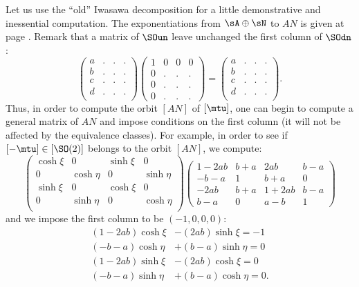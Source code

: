 Let us use the ``old''{} Iwasawa decomposition for a little demonstrative and inessential computation. The exponentiations from $\sA\oplus\sN$ to $AN$ is given at page \pageref{pg:exp_AN}. Remark that a matrix of $\SOun$ leave unchanged the first column of $\SOdn$: 
\[
\begin{pmatrix}
  a&.&.&.\\
  b&.&.&.\\
  c&.&.&.\\
  d&.&.&.\\
\end{pmatrix}
\begin{pmatrix}
 1&0&0&0\\
 0&.&.&.\\
 0&.&.&.\\
 0&.&.&.
\end{pmatrix}=
\begin{pmatrix}
  a&.&.&.\\
  b&.&.&.\\
  c&.&.&.\\
  d&.&.&.\\
\end{pmatrix}.
\]
Thus, in order to compute the orbit $[AN]$ of $[\mtu]$, one can begin to compute a general matrix of $AN$ and impose conditions on the first column (it will not be affected by the equivalence classes). For example, in order to see if $[-\mtu]\in [\SO(2)]$ belongs to the orbit $[AN]$, we compute:\label{PgExplAN}
\begin{equation}\label{eq:gene_R}			
   \begin{pmatrix}
  \cosh\xi &    0      & \sinh\xi &    0  \\
    0       & \cosh\eta &    0      & \sinh\eta \\
  \sinh\xi &    0      & \cosh\xi &    0     \\
    0       & \sinh\eta &    0      & \cosh\eta \\
     \end{pmatrix}
     \begin{pmatrix}
                 1-2ab & b+a & 2ab   & b-a \\
 		 -b-a  & 1   & b+a   &  0   \\
		 -2ab  & b+a & 1+2ab &  b-a \\
		  b-a  &  0  &  a-b  &  1  
	      \end{pmatrix}	
\end{equation}
and we impose the first column to be $( -1,0,0,0)$:
\begin{subequations}\label{eq:S_14}
\begin{align}
  (1-2ab)\cosh\xi&-(2ab)\sinh\xi=-1   \label{eq:S1}\\
  (-b-a)\cosh\eta&+(b-a)\sinh\eta=0    \label{eq:S2}\\
  (1-2ab)\sinh\xi&-(2ab)\cosh\xi=0     \label{eq:S3}\\
  (-b-a)\sinh\eta&+(b-a)\cosh\eta=0.  \label{eq:S4}
\end{align}
\end{subequations}
